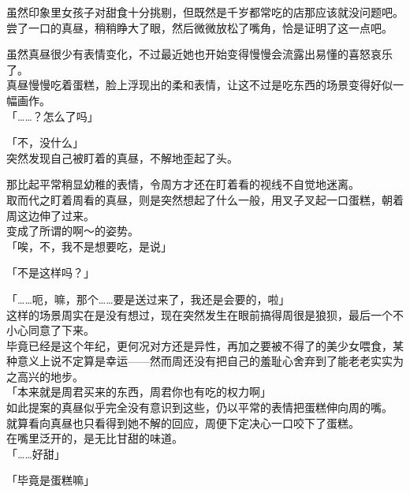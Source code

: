 虽然印象里女孩子对甜食十分挑剔，但既然是千岁都常吃的店那应该就没问题吧。\\

尝了一口的真昼，稍稍睁大了眼，然后微微放松了嘴角，恰是证明了这一点吧。

虽然真昼很少有表情变化，不过最近她也开始变得慢慢会流露出易懂的喜怒哀乐了。\\

真昼慢慢吃着蛋糕，脸上浮现出的柔和表情，让这不过是吃东西的场景变得好似一幅画作。\\

「……？怎么了吗」

「不，没什么」\\

突然发现自己被盯着的真昼，不解地歪起了头。

那比起平常稍显幼稚的表情，令周方才还在盯着看的视线不自觉地迷离。\\

取而代之盯着周看的真昼，则是突然想起了什么一般，用叉子叉起一口蛋糕，朝着周这边伸了过来。\\

变成了所谓的啊～的姿势。\\

「唉，不，我不是想要吃，是说」

「不是这样吗？」

「……呃，嘛，那个……要是送过来了，我还是会要的，啦」\\

这样的场景周实在是没有想过，现在突然发生在眼前搞得周很是狼狈，最后一个不小心同意了下来。\\

毕竟已经是这个年纪，更何况对方还是异性，再加之要被不得了的美少女喂食，某种意义上说不定算是幸运——然而周还没有把自己的羞耻心舍弃到了能老老实实为之高兴的地步。\\

「本来就是周君买来的东西，周君你也有吃的权力啊」\\

如此提案的真昼似乎完全没有意识到这些，仍以平常的表情把蛋糕伸向周的嘴。\\

就算看向真昼也只看得到她不解的回应，周便下定决心一口咬下了蛋糕。\\

在嘴里泛开的，是无比甘甜的味道。\\

「……好甜」

「毕竟是蛋糕嘛」\\

